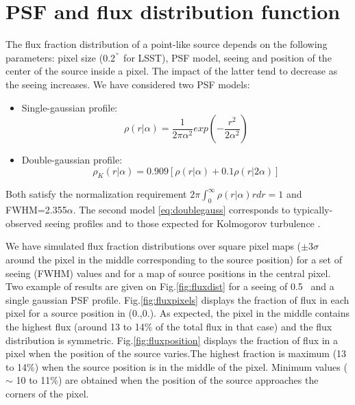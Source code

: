 \documentclass[\docopts]{\docclass}
\begin{document}
\section{PSF and flux distribution function}
\label{sec:psfflux}
The flux fraction distribution of a point-like source depends on the following  parameters: pixel size (0.2$^{"}$ for LSST), PSF model, seeing and position of the center of the source inside a pixel. The impact of the latter tend to decrease as the seeing increases. We have considered two PSF models:
\begin{itemize}
\item Single-gaussian profile:
  \begin{equation}
    \rho(r|\alpha)={\frac{1}{2\pi\alpha^2}}exp\left(-{\frac{r^2}{2\alpha^2}}\right) \label{eq:singlegauss}
   \end{equation}
\item Double-gaussian profile:
\begin{equation}
  \rho_K(r|\alpha)= 0.909 \left[\rho(r|\alpha)+0.1\rho(r|2\alpha)\right] \label{eq:doublegauss}
  \end{equation}
 \end{itemize}
Both satisfy the normalization requirement $ 2\pi \int^{\infty}_{0} \rho(r|\alpha) r dr = 1$ and FWHM=2.355$\alpha$. The second model \eqref{eq:doublegauss} corresponds to typically-observed seeing profiles and to those expected for Kolmogorov turbulence \cite{LSE40}. \par
We have simulated flux fraction distributions over square pixel maps ($\pm 3 \sigma$ around the pixel in the middle corresponding to the source position) for a set of seeing (FWHM) values and for a map of source positions in the central pixel.  Two example of results are given on Fig.\ref{fig:fluxdist} for a seeing of 0.5\arcsec~ and a single gaussian PSF profile. Fig.\ref{fig:fluxpixels} displays the fraction of flux in each pixel for a source position in (0.,0.). As expected, the pixel in the middle contains the highest flux (around 13 to 14\% of the total flux in that case) and the flux distribution is symmetric.  Fig.\ref{fig:fluxposition} displays the fraction of flux in a pixel when the position of the source varies.The highest fraction is maximum (13 to 14\%) when the source position is in the middle of the pixel. Minimum values ($\sim$ 10 to 11\%) are obtained when the position of the source approaches the corners of the pixel.
\end{document}
